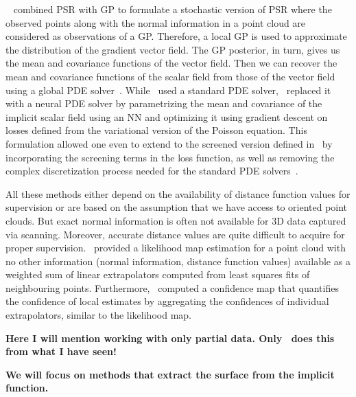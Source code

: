 ~\cite{SPSR} combined PSR with GP to formulate a stochastic version of PSR where the observed points along with the normal information in a point cloud are considered as observations of a GP. Therefore, a local GP is used to approximate the distribution of the gradient vector field. The GP posterior, in turn, gives us the mean and covariance functions of the vector field. Then we can recover the mean and covariance functions of the scalar field from those of the vector field using a global PDE solver~\cite{SPSR}. While~\cite{SPSR} used a standard PDE solver,~\cite{NeuralSPSR} replaced it with a neural PDE solver by parametrizing the mean and covariance of the implicit scalar field using an NN and optimizing it using gradient descent on losses defined from the variational version of the Poisson equation. This formulation allowed one even to extend to the screened version defined in~\cite{ScreenedPSR} by incorporating the screening terms in the loss function, as well as removing the complex discretization process needed for the standard PDE solvers~\cite{NeuralSPSR}. 

All these methods either depend on the availability of distance function values for supervision or are based on the assumption that we have access to oriented point clouds. But exact normal information is often not available for 3D data captured via scanning. Moreover, accurate distance values are quite difficult to acquire for proper supervision.~\cite{UncPCS} provided a likelihood map estimation for a point cloud with no other information (normal information, distance function values) available as a weighted sum of linear extrapolators computed from least squares fits of neighbouring points. Furthermore,~\cite{UncPCS} computed a confidence map that quantifies the confidence of local estimates by aggregating the confidences of individual extrapolators, similar to the likelihood map.

\textbf{\color{orange}Here I will mention working with only partial data. Only~\cite{geoPriorGPIS} does this from what I have seen!}

\textbf{\color{orange}We will focus on methods that extract the surface from the implicit function.}
